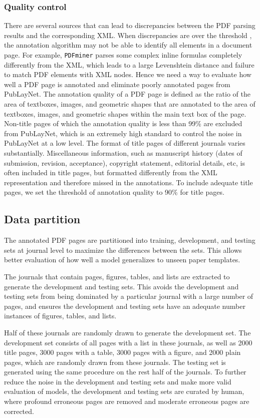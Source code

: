 \documentclass[conference]{IEEEtran}
\begin{document}
\subsubsection{Quality control}

There are several sources that can lead to discrepancies between the PDF parsing results and the corresponding XML. When discrepancies are over the threshold , the annotation algorithm may not be able to identify all elements in a document page. For example, \texttt{PDFminer} parses some complex inline formulas completely differently from the XML, which leads to a large Levenshtein distance and failure to match PDF elements with XML nodes. Hence we need a way to evaluate how well a PDF page is annotated and eliminate poorly annotated pages from PubLayNet. The annotation quality of a PDF page is defined as the ratio of the area of textboxes, images, and geometric shapes that are annotated to the area of textboxes, images, and geometric shapes within the main text box of the page. Non-title pages of which the annotation quality is less than 99\% are excluded from PubLayNet, which is an extremely high standard to control the noise in PubLayNet at a low level. The format of title pages of different journals varies substantially. Miscellaneous information, such as manuscript history (dates of submission, revision, acceptance), copyright statement, editorial details, etc, is often included in title pages, but formatted differently from the XML representation and therefore missed in the annotations. To include adequate title pages, we set the threshold of annotation quality to 90\% for title pages.

\subsection{Data partition}

The annotated PDF pages are partitioned into training, development, and testing sets at journal level to maximize the differences between the sets. This allows better evaluation of how well a model generalizes to unseen paper templates.

The journals that contain  pages,  figures,  tables, and  lists are extracted to generate the development and testing sets. This avoids the development and testing sets from being dominated by a particular journal with a large number of pages, and ensures the development and testing sets have an adequate number instances of figures, tables, and lists.

Half of these journals are randomly drawn to generate the development set. The development set consists of all pages with a list in these journals, as well as 2000 title pages, 3000 pages with a table, 3000 pages with a figure, and 2000 plain pages, which are randomly drawn from these journals. The testing set is generated using the same procedure on the rest half of the journals. To further reduce the noise in the development and testing sets and make more valid evaluation of models, the development and testing sets are curated by human, where profound erroneous pages are removed and moderate erroneous pages are corrected.
\end{document}

